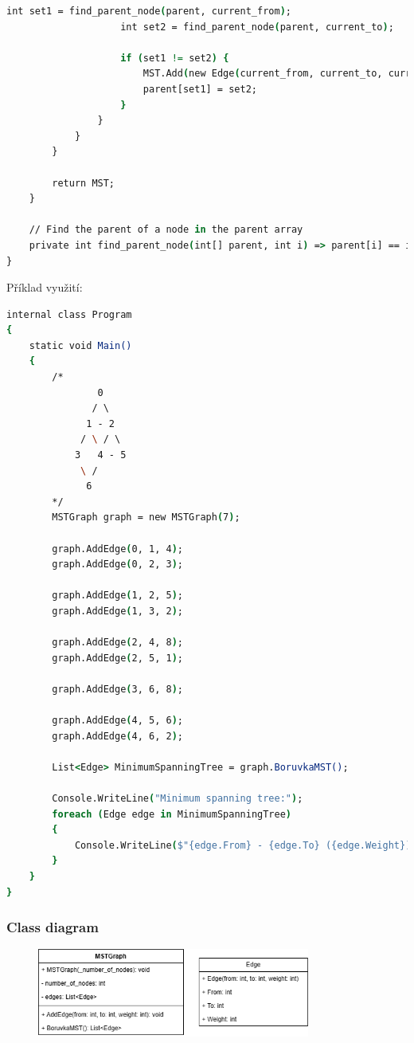 \documentclass[11pt]{article}
\begin{document}
\begin{lstlisting}[language=csh]
                    int set1 = find_parent_node(parent, current_from);
                    int set2 = find_parent_node(parent, current_to);

                    if (set1 != set2) {
                        MST.Add(new Edge(current_from, current_to, current_weight));
                        parent[set1] = set2;
                    }
                }
            }
        }

        return MST;
    }

    // Find the parent of a node in the parent array
    private int find_parent_node(int[] parent, int i) => parent[i] == i ? i : (parent[i] = find_parent_node(parent, parent[i]));
}
\end{lstlisting}

\medbreak\noindent
Příklad využití:
\begin{lstlisting}[language=csh]
internal class Program
{
    static void Main()
    {
        /*
                0
               / \
              1 - 2
             / \ / \
            3   4 - 5
             \ /
              6
        */
        MSTGraph graph = new MSTGraph(7);

        graph.AddEdge(0, 1, 4);
        graph.AddEdge(0, 2, 3);

        graph.AddEdge(1, 2, 5);
        graph.AddEdge(1, 3, 2);

        graph.AddEdge(2, 4, 8);
        graph.AddEdge(2, 5, 1);

        graph.AddEdge(3, 6, 8);

        graph.AddEdge(4, 5, 6);
        graph.AddEdge(4, 6, 2);

        List<Edge> MinimumSpanningTree = graph.BoruvkaMST();

        Console.WriteLine("Minimum spanning tree:");
        foreach (Edge edge in MinimumSpanningTree)
        {
            Console.WriteLine($"{edge.From} - {edge.To} ({edge.Weight})");
        }
    }
}
\end{lstlisting}

\subsubsection{Class diagram}
\begin{figure}[h]
	\centering
	\includegraphics[width=0.8\textwidth]{class_diagram_boruvka_alg.png}
\end{figure}
\pagebreak
\end{document}
